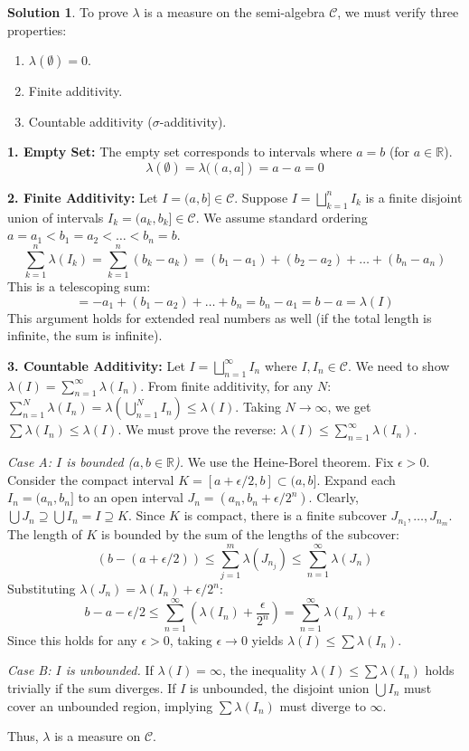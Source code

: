 \documentclass{article}
\theoremstyle{definition}
\newtheorem*{solution}{Solution}
\begin{document}
\begin{solution}
To prove $\lambda$ is a measure on the semi-algebra $\mathcal{C}$, we must verify three properties:
\begin{enumerate}
    \item $\lambda(\emptyset) = 0$.
    \item Finite additivity.
    \item Countable additivity ($\sigma$-additivity).
\end{enumerate}

\textbf{1. Empty Set:}
The empty set corresponds to intervals where $a=b$ (for $a \in \mathbb{R}$).
\[ \lambda(\emptyset) = \lambda((a,a]) = a - a = 0 \]

\textbf{2. Finite Additivity:}
Let $I = (a, b] \in \mathcal{C}$. Suppose $I = \bigsqcup_{k=1}^n I_k$ is a finite disjoint union of intervals $I_k = (a_k, b_k] \in \mathcal{C}$.
We assume standard ordering $a = a_1 < b_1 = a_2 < \dots < b_n = b$.
\[ \sum_{k=1}^n \lambda(I_k) = \sum_{k=1}^n (b_k - a_k) = (b_1 - a_1) + (b_2 - a_2) + \dots + (b_n - a_n) \]
This is a telescoping sum:
\[ = -a_1 + (b_1 - a_2) + \dots + b_n = b_n - a_1 = b - a = \lambda(I) \]
This argument holds for extended real numbers as well (if the total length is infinite, the sum is infinite).

\textbf{3. Countable Additivity:}
Let $I = \bigsqcup_{n=1}^\infty I_n$ where $I, I_n \in \mathcal{C}$. We need to show $\lambda(I) = \sum_{n=1}^\infty \lambda(I_n)$.
From finite additivity, for any $N$: $\sum_{n=1}^N \lambda(I_n) = \lambda(\bigcup_{n=1}^N I_n) \le \lambda(I)$. Taking $N \to \infty$, we get $\sum \lambda(I_n) \le \lambda(I)$.
We must prove the reverse: $\lambda(I) \le \sum_{n=1}^\infty \lambda(I_n)$.

\textit{Case A: $I$ is bounded ($a, b \in \mathbb{R}$).}
We use the Heine-Borel theorem. Fix $\epsilon > 0$.
Consider the compact interval $K = [a+\epsilon/2, b] \subset (a, b]$.
Expand each $I_n = (a_n, b_n]$ to an open interval $J_n = (a_n, b_n + \epsilon/2^n)$.
Clearly, $\bigcup J_n \supseteq \bigcup I_n = I \supseteq K$. Since $K$ is compact, there is a finite subcover $J_{n_1}, \dots, J_{n_m}$.
The length of $K$ is bounded by the sum of the lengths of the subcover:
\[ (b - (a+\epsilon/2)) \le \sum_{j=1}^m \lambda(J_{n_j}) \le \sum_{n=1}^\infty \lambda(J_n) \]
Substituting $\lambda(J_n) = \lambda(I_n) + \epsilon/2^n$:
\[ b - a - \epsilon/2 \le \sum_{n=1}^\infty (\lambda(I_n) + \frac{\epsilon}{2^n}) = \sum_{n=1}^\infty \lambda(I_n) + \epsilon \]
Since this holds for any $\epsilon > 0$, taking $\epsilon \to 0$ yields $\lambda(I) \le \sum \lambda(I_n)$.

\textit{Case B: $I$ is unbounded.}
If $\lambda(I) = \infty$, the inequality $\lambda(I) \le \sum \lambda(I_n)$ holds trivially if the sum diverges. If $I$ is unbounded, the disjoint union $\bigcup I_n$ must cover an unbounded region, implying $\sum \lambda(I_n)$ must diverge to $\infty$.

Thus, $\lambda$ is a measure on $\mathcal{C}$.
\end{solution}
\end{document}
